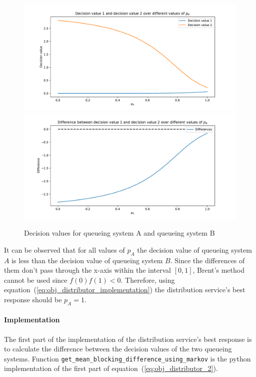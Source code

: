 \begin{figure}[H]
    \centering
    \includegraphics[width=\textwidth]{chapters/04_game_theoretic_model/img/brents_method/brent_method_special_case.pdf}
    \includegraphics[width=\textwidth]{chapters/04_game_theoretic_model/img/brents_method/brent_method_special_case_diffs.pdf}
    \caption{Decision values for queueing system A and queueing system B}
    \label{fig:brent_method_special_case}
\end{figure}

It can be observed that for all values of \(p_A\) the decision value of queueing
system \(A\) is less than the decision value of queueing system \(B\).
Since the differences of them don't pass through the x-axis within the interval
\([0,1]\), Brent's method cannot be used since \(f(0)f(1) < 0\).
Therefore, using equation~(\ref{eq:obj_distributor_implementation}) the
distribution service's best response should be \(p_A = 1\).

\paragraph{Implementation}

The first part of the implementation of the distribution service's best
response is to calculate the difference between the decision values of the two
queueing systems.
Function \lstinline[style=pystyle]{get_mean_blocking_difference_using_markov}
is the python implementation of the first part of
equation~(\ref{eq:obj_distributor_2}).

